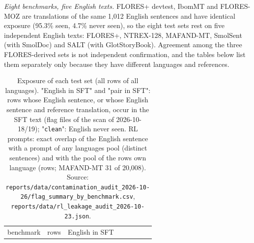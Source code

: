 \emph{Eight benchmarks, five English texts.} FLORES+ devtest, IbomMT and FLORES-MOZ are translations of the same 1,012 English sentences and have identical exposure (95.3\% seen, 4.7\% never seen), so the eight test sets rest on five independent English texts: FLORES+, NTREX-128, MAFAND-MT, SmolSent (with SmolDoc) and SALT (with GlotStoryBook). Agreement among the three FLORES-derived sets is not independent confirmation, and the tables below list them separately only because they have different languages and references.

\begin{table}[t]
\centering
\footnotesize
\setlength{\tabcolsep}{3pt}
\caption{Exposure of each test set (all rows of all languages). "English in SFT" and "pair in SFT": rows whose English sentence, or whose English sentence and reference translation, occur in the SFT text (flag files of the scan of 2026-10-18/19); "\texttt{clean}": English never seen. RL prompts: exact overlap of the English sentence with a prompt of any language\textquotesingle s pool (distinct sentences) and with the pool of the row\textquotesingle s own language (rows; MAFAND-MT 31 of 20,008). Source: \texttt{reports/data/contamination\_audit\_2026-10-26/flag\_summary\_by\_benchmark.csv}, \texttt{reports/data/rl\_leakage\_audit\_2026-10-23.json}.}
\label{tab:t_exposure_bench}
{\def\LTcaptype{none} %
\begin{tabular}{@{}
  >{\raggedright\arraybackslash}p{}
  >{\raggedleft\arraybackslash}p{}
  >{\raggedleft\arraybackslash}p{}
  >{\raggedleft\arraybackslash}p{}
  >{\raggedleft\arraybackslash}p{}
  >{\raggedright\arraybackslash}p{}
  >{\raggedleft\arraybackslash}p{}
  >{\raggedright\arraybackslash}p{}@{}}
\toprule
\begin{minipage}[b]{\linewidth}\raggedright
benchmark
\end{minipage} & \begin{minipage}[b]{\linewidth}\raggedleft
rows
\end{minipage} & \begin{minipage}[b]{\linewidth}\raggedleft
English in SFT
\end{minipage} & \begin{minipage}[b]{\linewidth}\raggedleft

\end{minipage}
\end{tabular}}
\end{table}
